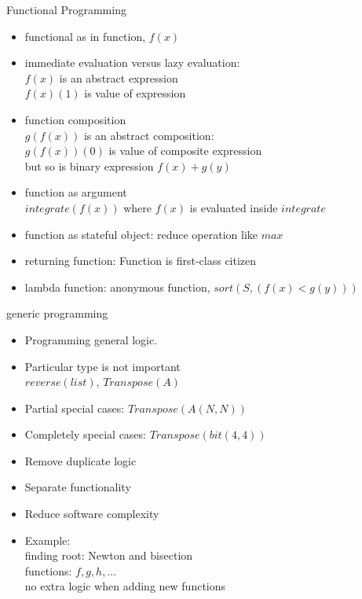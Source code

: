 \documentclass{beamer}
\begin{document}
\begin{frame}{ Functional Programming}
  \begin{itemize}
  \item functional as in function, $f(x)$
  \item immediate evaluation versus lazy evaluation: \\
    $f(x)$ is an abstract expression \\
    $f(x)(1)$ is value of expression
  \item function composition\\
    $g(f(x))$ is an abstract composition: \\
    $g(f(x))(0)$  is value of composite expression \\
    but so is binary expression $f(x) + g(y)$
  \item function as argument\\
    $integrate(f(x))$ where $f(x)$ is evaluated inside $integrate$
  \item function as stateful object: reduce operation like $max$
  \item returning function: Function is first-class citizen
  \item  lambda function: anonymous function, $sort(S, (f(x) < g(y)))$
  \end{itemize}
\end{frame}


\begin{frame}{generic programming}
  \begin{itemize}
  \item Programming general logic.
  \item Particular type is not important\\
    $reverse(list)$, $Transpose(A)$
  \item Partial special cases:    $Transpose(A(N,N))$
  \item Completely special cases:    $Transpose(bit(4,4))$
  \item Remove duplicate logic
  \item Separate functionality
  \item Reduce software complexity
  \item Example:\\
    finding root: Newton and bisection\\
    functions: $f, g, h, ...$ \\
    no extra logic when adding new functions
  \end{itemize}
\end{frame}
\end{document}
